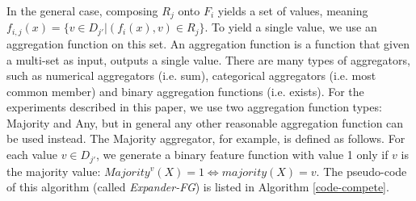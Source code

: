 \documentclass[twoside,11pt]{article}
\theoremstyle{definition}
\begin{document}

In the general case, composing $R_j$ onto $F_i$ yields a set of values, meaning $f_{i,j}(x)=\{v\in D_{j'}|(f_i(x),v)\in R_j\}$. 
To yield a single value, we use an aggregation function on this set.
An aggregation function is a function that given a multi-set as input, outputs a single value. There are many types of aggregators, such as numerical aggregators (i.e. sum), categorical aggregators (i.e. most common member) and binary aggregation functions (i.e. exists).
For the experiments described in this paper, we use  
 two aggregation function types: Majority and Any, but in general any other reasonable aggregation function can be used instead.
The Majority aggregator, for example, is defined as follows.  For each value $v\in D_{j'}$, we generate a binary feature function with value 1 only if $v$ is the majority value: 
$Majority^v(X)=1 \iff majority(X)=v$.
The pseudo-code of this algorithm (called   
\emph{Expander-FG}) is listed in Algorithm \ref{code-compete}.

\end{document}
